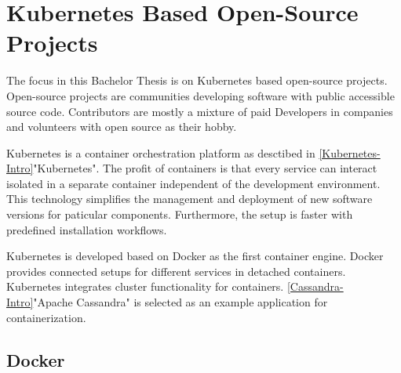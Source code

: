 \section{Kubernetes Based Open-Source Projects}

The focus in this Bachelor Thesis is on Kubernetes based open-source projects. Open-source projects are communities developing software with public accessible source code. Contributors are mostly a mixture of paid Developers in companies and volunteers with open source as their hobby.

Kubernetes is a container orchestration platform as desctibed in \ref{Kubernetes-Intro}"Kubernetes".
The profit of containers is that every service can interact isolated in a separate container independent of the development environment. This technology simplifies the management and deployment of new software versions for paticular components.
Furthermore, the setup is faster with predefined installation workflows.

Kubernetes is developed based on Docker as the first container engine. Docker provides connected setups for different services in detached containers. Kubernetes integrates cluster functionality for containers.
\ref{Cassandra-Intro}"Apache Cassandra" is selected as an example application for containerization.

\subsection{Docker}\label{Docker-Intro}

